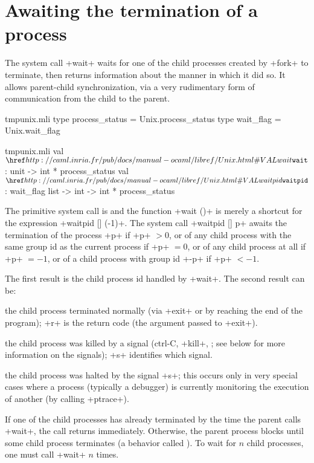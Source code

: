 \section{Awaiting the termination of a process} \label{double-fork}

The system call \ml+wait+ waits for one of the child processes created
by \ml+fork+ to terminate, then returns information about the manner
in which it did so.  It allows parent-child synchronization, via a
very rudimentary form of communication from the child to the parent.
\label{wait}
%
\begin{codefile}{tmpunix.mli}
type process_status = Unix.process_status
type wait_flag = Unix.wait_flag
\end{codefile}
%
\begin{listingcodefile}{tmpunix.mli}
val $\indexlibvalue{Unix}{wait}$ : unit -> int * process_status
val $\libvalue{Unix}{waitpid}$ : wait_flag list -> int -> int * process_status
\end{listingcodefile}
%
The primitive system call is  and the function
\ml+wait ()+ is merely a shortcut for the expression \ml+waitpid [] (-1)+.
%
The system call \ml+waitpid [] p+ awaits the termination of the
process \ml+p+ if \ml+p+ $> 0$, or of any child process with the same
group id as the current process if \ml+p+ $= 0$, or of any child
process at all if \ml+p+ $= -1$, or of a child process with group id
\ml+-p+ if \ml+p+ $<-1$.

The first result is the child process id handled by \ml+wait+. The
second result can be:
%
\begin{mltypecases}
 the child process terminated normally (via
\ml+exit+ or by reaching the end of the program); \ml+r+ is the return
code (the argument passed to \ml+exit+).

 the child process was killed by a signal
(ctrl-C, \ml+kill+, \etc; see below for more information on the
signals); \ml+s+ identifies which signal.

 the child process was halted by the signal
\ml+s+; this occurs only in very special cases where a process
(typically a debugger) is currently monitoring the execution of
another (by calling \ml+ptrace+).
\end{mltypecases}
%
If one of the child processes has already terminated by the time the
parent calls \ml+wait+, the call returns immediately.  Otherwise, the
parent process blocks until some child process terminates (a behavior
called ). To wait for $n$ child processes, one must
call \ml+wait+ $n$ times.

